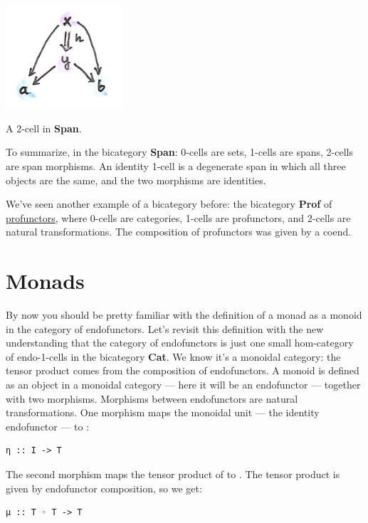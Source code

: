 \hypertarget{attachment_9111}{}
\includegraphics[width=1.70833in]{images/morphspan.png}

A 2-cell in \textbf{Span}.

To summarize, in the bicategory \textbf{Span}: 0-cells are sets, 1-cells
are spans, 2-cells are span morphisms. An identity 1-cell is a
degenerate span in which all three objects are the same, and the two
morphisms are identities.

We've seen another example of a bicategory before: the bicategory
\textbf{Prof} of
\href{https://bartoszmilewski.com/2017/03/29/ends-and-coends/}{profunctors},
where 0-cells are categories, 1-cells are profunctors, and 2-cells are
natural transformations. The composition of profunctors was given by a
coend.

\section{Monads}\label{monads}

By now you should be pretty familiar with the definition of a monad as a
monoid in the category of endofunctors. Let's revisit this definition
with the new understanding that the category of endofunctors is just one
small hom-category of endo-1-cells in the bicategory \textbf{Cat}. We
know it's a monoidal category: the tensor product comes from the
composition of endofunctors. A monoid is defined as an object in a
monoidal category --- here it will be an endofunctor  ---
together with two morphisms. Morphisms between endofunctors are natural
transformations. One morphism maps the monoidal unit --- the identity
endofunctor --- to :

\begin{Verbatim}[commandchars=\\\{\}]
η :: I -> T
\end{Verbatim}

The second morphism maps the tensor product of  to
. The tensor product is given by endofunctor composition, so
we get:

\begin{Verbatim}[commandchars=\\\{\}]
μ :: T ◦ T -> T
\end{Verbatim}

